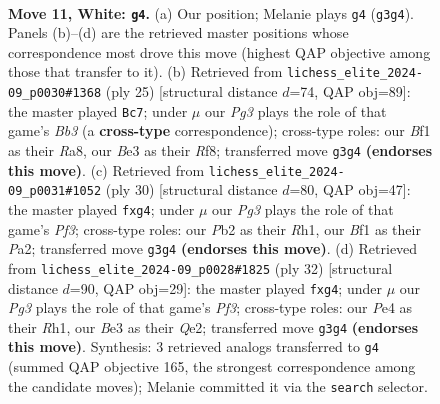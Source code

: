 \documentclass[11pt]{article}
\begin{document}
\clearpage

\begin{figure}[p]\centering
\begin{subfigure}{0.46\textwidth}\centering
\resizebox{\linewidth}{!}{%
\newchessgame
\chessboard[
  setfen={rnb1k2r/ppq1p1bp/3p2p1/4p2n/4P3/2N1BQP1/PPP2P1P/2KR1B1R w kq - 1 11},
  showmover=false,
  pgfstyle=straightmove, color=movearrow, markmove={g3-g4}
]}
\caption{}
\end{subfigure}\hfill
\begin{subfigure}{0.46\textwidth}\centering
\resizebox{\linewidth}{!}{%
\newchessgame
\chessboard[
  setfen={r4rk1/pp2qppp/1bppbn2/4p3/2N1P3/1BPP4/PP2QPPP/R1B2R1K b - - 8 13},
  showmover=false,
  pgfstyle=straightmove, color=movearrow, markmove={b6-c7}
]}
\caption{}
\end{subfigure}
\\[4pt]
\begin{subfigure}{0.46\textwidth}\centering
\resizebox{\linewidth}{!}{%
\newchessgame
\chessboard[
  setfen={r1b1k2r/pp2q1b1/2pp3p/4np2/2B2BpP/2N1PP2/PPP1Q1P1/2KR3R w kq - 2 16},
  showmover=false,
  pgfstyle=straightmove, color=movearrow, markmove={f3-g4}
]}
\caption{}
\end{subfigure}\hfill
\begin{subfigure}{0.46\textwidth}\centering
\resizebox{\linewidth}{!}{%
\newchessgame
\chessboard[
  setfen={r3k2r/pp2q1b1/2ppb2p/4np2/5BpP/1BN1PP2/PPP1Q1P1/2KR3R w kq - 4 17},
  showmover=false,
  pgfstyle=straightmove, color=movearrow, markmove={f3-g4}
]}
\caption{}
\end{subfigure}
\caption{\textbf{Move 11, White: \texttt{g4}.} (a) Our position; Melanie plays \texttt{g4} (\texttt{g3g4}). Panels (b)--(d) are the retrieved master positions whose correspondence most drove this move (highest QAP objective among those that transfer to it). (b) Retrieved from \texttt{lichess\_elite\_2024-09\_p0030\#1368} (ply 25) [structural distance $d$=74, QAP obj=89]: the master played \texttt{Bc7}; under $\mu$ our \emph{Pg3} plays the role of that game's \emph{Bb3} (a \textbf{cross-type} correspondence); cross-type roles: our \emph{B}f1 as their \emph{R}a8, our \emph{B}e3 as their \emph{R}f8; transferred move \texttt{g3g4} \textbf{(endorses this move)}. (c) Retrieved from \texttt{lichess\_elite\_2024-09\_p0031\#1052} (ply 30) [structural distance $d$=80, QAP obj=47]: the master played \texttt{fxg4}; under $\mu$ our \emph{Pg3} plays the role of that game's \emph{Pf3}; cross-type roles: our \emph{P}b2 as their \emph{R}h1, our \emph{B}f1 as their \emph{P}a2; transferred move \texttt{g3g4} \textbf{(endorses this move)}. (d) Retrieved from \texttt{lichess\_elite\_2024-09\_p0028\#1825} (ply 32) [structural distance $d$=90, QAP obj=29]: the master played \texttt{fxg4}; under $\mu$ our \emph{Pg3} plays the role of that game's \emph{Pf3}; cross-type roles: our \emph{P}e4 as their \emph{R}h1, our \emph{B}e3 as their \emph{Q}e2; transferred move \texttt{g3g4} \textbf{(endorses this move)}. Synthesis: 3 retrieved analogs transferred to \texttt{g4} (summed QAP objective 165, the strongest correspondence among the candidate moves); Melanie committed it via the \texttt{search} selector.}
\label{fig:thought-m20}
\end{figure}
\end{document}

